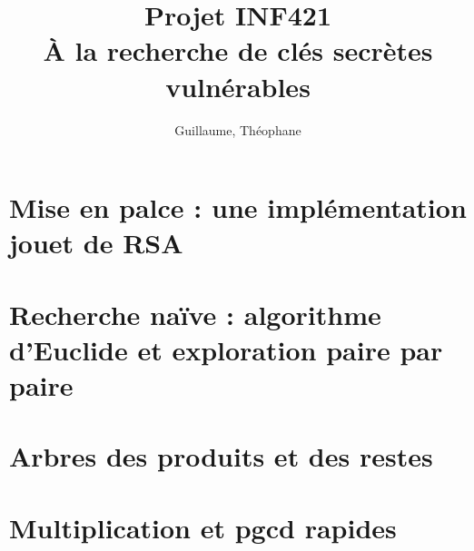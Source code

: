 \documentclass[a4paper,10pt]{article}
\title{Projet INF421 \\ À la recherche de clés secrètes vulnérables}
\author{\bsc{Hétier} Guillaume, \bsc{Hufschmitt} Théophane}
\begin{document}
\maketitle

\begin{abstract}

\end{abstract}

\section{Mise en palce : une implémentation jouet de RSA}
\section{Recherche naïve : algorithme d'Euclide et exploration paire par paire}
\section{Arbres des produits et des restes}
\section{Multiplication et pgcd rapides}
\end{document}
